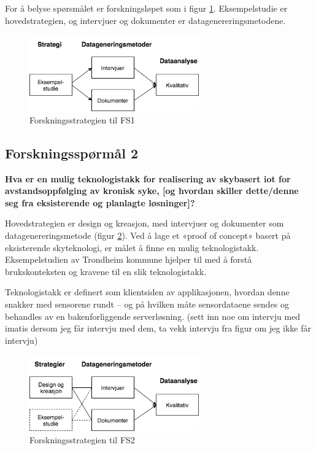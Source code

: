 For å belyse spørsmålet er forskningsløpet som i figur \ref{fig:oates_fs1}. Eksempelstudie er hovedstrategien, og intervjuer og dokumenter
er datagenereringsmetodene.

\begin{figure}
\centering
\includegraphics[width=0.65\textwidth]{fig/oates/fs1}
\caption{Forskningsstrategien til FS1}
\label{fig:oates_fs1}
\end{figure}

\subsection{Forskningsspørmål 2}
\textbf{Hva er en mulig teknologistakk for realisering av skybasert \gls{iot} for avstandsoppfølging av kronisk syke,
    [og hvordan skiller dette/denne seg fra eksisterende og planlagte løsninger]?}

Hovedstrategien er design og kreasjon, med intervjuer og dokumenter som datagenereringsmetode (figur \ref{fig:oates_fs2}). Ved å lage
et «proof of concept» basert på eksisterende skyteknologi, er målet å finne en mulig teknologistakk. Eksempelstudien av Trondheim
kommune hjelper til med å forstå brukskonteksten og kravene til en slik teknologistakk.

Teknologistakk er definert
som klientsiden av applikasjonen, hvordan denne snakker med sensorene rundt -- og på hvilken måte sensordataene sendes og behandles av
en bakenforliggende serverløsning.
(sett inn noe om intervju med imatis dersom jeg får intervju med dem, ta vekk intervju fra figur om jeg ikke får intervju)

\begin{figure}
\centering
\includegraphics[width=0.65\textwidth]{fig/oates/fs2}
\caption{Forskningsstrategien til FS2}
\label{fig:oates_fs2}
\end{figure}
    
